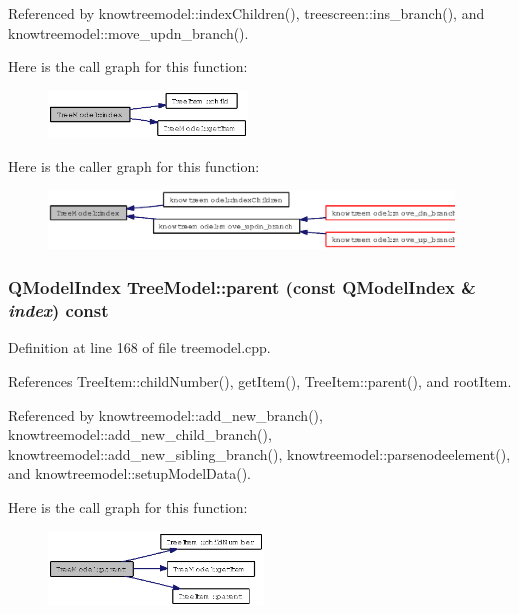 Referenced by knowtreemodel::index\-Children(), treescreen::ins\_\-branch(), and knowtreemodel::move\_\-updn\_\-branch().

Here is the call graph for this function:\begin{figure}[H]
\begin{center}
\leavevmode
\includegraphics[width=150pt]{classTreeModel_0e6e6bbdb55d08be64cab7bafba2ce21_cgraph}
\end{center}
\end{figure}


Here is the caller graph for this function:\begin{figure}[H]
\begin{center}
\leavevmode
\includegraphics[width=305pt]{classTreeModel_0e6e6bbdb55d08be64cab7bafba2ce21_icgraph}
\end{center}
\end{figure}
\subsubsection{\setlength{\rightskip}{0pt plus 5cm}QModel\-Index Tree\-Model::parent (const QModel\-Index \& {\em index}) const}\label{classTreeModel_d29cef85c6bb0db25fb3d5b844c22e94}




Definition at line 168 of file treemodel.cpp.

References Tree\-Item::child\-Number(), get\-Item(), Tree\-Item::parent(), and root\-Item.

Referenced by knowtreemodel::add\_\-new\_\-branch(), knowtreemodel::add\_\-new\_\-child\_\-branch(), knowtreemodel::add\_\-new\_\-sibling\_\-branch(), knowtreemodel::parsenodeelement(), and knowtreemodel::setup\-Model\-Data().

Here is the call graph for this function:\begin{figure}[H]
\begin{center}
\leavevmode
\includegraphics[width=162pt]{classTreeModel_d29cef85c6bb0db25fb3d5b844c22e94_cgraph}
\end{center}
\end{figure}


